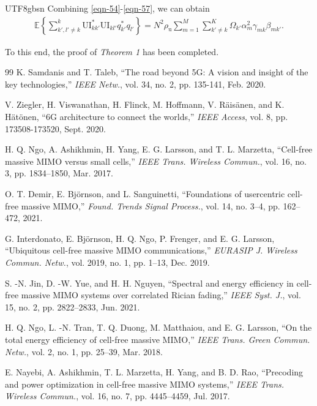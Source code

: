 \documentclass[lettersize,journal]{IEEEtran}
\begin{document}
\begin{CJK}{UTF8}{gbsn}
Combining \eqref{eqn-54}-\eqref{eqn-57}, we can obtain
\begin{equation}\begin{aligned}\mathbb{E}\left\{ {\mathop \sum \limits_{k',l' \ne k}^k \text{UI}_{kk'}^ * \text{UI}_{kl'}q_{k'}^ * {q_{l'}}} \right\} = {N^2}{\rho _\text{u}}\mathop \sum \limits_{m = 1}^M {\mathop \sum \limits_{k' \ne k}^K\Omega _{k'} \alpha _m^2{\gamma _{mk}}{\beta _{mk'}}}. \end{aligned}\end{equation}


To this end, the proof of \textit{Theorem 1} has been completed.



\begin{thebibliography}{99}
K. Samdanis and T. Taleb, “The road beyond 5G: A vision and insight of the key technologies,” \textit{IEEE Netw.}, vol. 34, no. 2, pp. 135-141, Feb. 2020.

V. Ziegler, H. Viswanathan, H. Flinck, M. Hoffmann, V. Räisänen, and K. Hätönen, “6G architecture to connect the worlds,” \textit{IEEE Access}, vol. 8, pp. 173508-173520, Sept. 2020.

H. Q. Ngo, A. Ashikhmin, H. Yang, E. G. Larsson, and T. L. Marzetta, “Cell-free massive MIMO versus small cells,” \textit{IEEE Trans. Wireless Commun.}, vol. 16, no. 3, pp. 1834–1850, Mar. 2017.

O. T. Demir, E. Björnson, and L. Sanguinetti, “Foundations of usercentric cell-free massive MIMO,” \textit{Found. Trends Signal Process.}, vol. 14, no. 3–4, pp. 162–472, 2021.

G. Interdonato, E. Björnson, H. Q. Ngo, P. Frenger, and E. G. Larsson, “Ubiquitous cell-free massive MIMO communications,” \textit{EURASIP J. Wireless Commun. Netw.}, vol. 2019, no. 1, pp. 1–13, Dec. 2019.

S. -N. Jin, D. -W. Yue, and H. H. Nguyen, “Spectral and energy efficiency in cell-free massive MIMO systems over correlated Rician fading,” \textit{IEEE Syst. J.}, vol. 15, no. 2, pp. 2822–2833, Jun. 2021.

H. Q. Ngo, L. -N. Tran, T. Q. Duong, M. Matthaiou, and E. G. Larsson, “On the total energy efficiency of cell-free massive MIMO,” \textit{IEEE Trans. Green Commun. Netw.}, vol. 2, no. 1, pp. 25–39, Mar. 2018.

E. Nayebi, A. Ashikhmin, T. L. Marzetta, H. Yang, and B. D. Rao, “Precoding and power optimization in cell-free massive MIMO systems,” \textit{IEEE Trans. Wireless Commun.}, vol. 16, no. 7, pp. 4445–4459, Jul. 2017.


\end{thebibliography}
\end{CJK}
\end{document}

